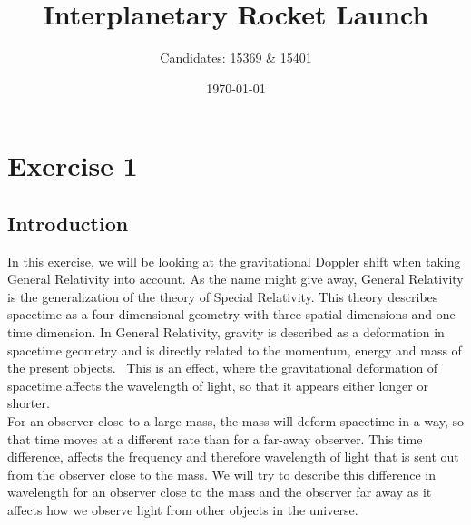 \documentclass[reprint,english,notitlepage]{revtex4-2}
\begin{document}
\title{Interplanetary Rocket Launch}
\author{Candidates: 15369 \& 15401}
\date{\today}

\maketitle

\section{Exercise 1}\label{sec:exercise-1}
    \subsection{Introduction}\label{subsec:introduction1}
        In this exercise, we will be looking at the gravitational Doppler shift when taking General Relativity into account.
        As the name might give away, General Relativity is the generalization of the theory of Special Relativity.
        This theory describes spacetime as a four-dimensional geometry with three spatial dimensions and one time dimension.
        In General Relativity, gravity is described as a deformation in spacetime geometry and is directly related to the momentum, energy and mass of the present objects.~\parencite[][]{wiki_gr}
        This is an effect, where the gravitational deformation of spacetime affects the wavelength of light, so that it appears either longer or shorter.\\
        For an observer close to a large mass, the mass will deform spacetime in a way, so that time moves at a different rate than for a far-away observer.
        This time difference, affects the frequency and therefore wavelength of light that is sent out from the observer close to the mass.
        We will try to describe this difference in wavelength for an observer close to the mass and the observer far away as it affects how we observe light from other objects in the universe.
\end{document}
